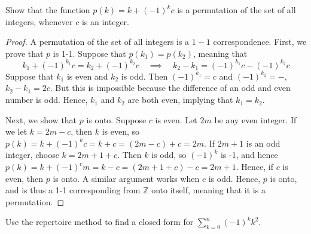 \documentclass[12pt]{article}
\newenvironment{ex}[2][Exercise]{\begin{trivlist}
		\item[\hskip \labelsep {\bfseries #1}\hskip \labelsep {\bfseries #2.}]}{\end{trivlist}}
\newenvironment{sol}[1][Solution]{\begin{trivlist}
		\item[\hskip \labelsep {\bfseries #1:}]}{\end{trivlist}}
\begin{document}
\begin{ex}{12}
	Show that the function $p(k)=k+(-1)^kc$ is a permutation of the
	set of all integers, whenever $c$ is an integer.
\end{ex}

\begin{sol}
	\begin{proof}
		A permutation of the set of all integers is a $1-1$ correspondence. First, we prove that
		$p$ is 1-1. Suppose that $p(k_1)=p(k_2)$, meaning that
		\[
		k_1+(-1)^{k_1}c=k_2+(-1)^{k_2}c\quad\implies\quad k_2-k_1=(-1)^{k_1}c-(-1)^{k_2}c
		\]
		Suppose that $k_1$ is even and $k_2$ is odd. Then $(-1)^{k_1}=c$ and $(-1)^{k_2}=-$,
		$k_2-k_1=2c$. But this is impossible because the difference of an odd and
		even number is odd. Hence, $k_1$ and $k_2$ are both even, implying that $k_1=k_2$.
		\
		
		Next, we show that $p$ is onto. Suppose $c$ is even. Let $2m$ be any even integer.
		If we let $k=2m-c$, then $k$ is even, so $p(k)=k+(-1)^{k}c=k+c=(2m-c)+c=2m$.
		If $2m+1$ is an odd integer, choose $k=2m+1+c$. Then $k$ is odd, so $(-1)^k$ is -1,
		and hence $p(k)=k+(-1)^cm=k-c=(2m+1+c)-c=2m+1$. Hence, if $c$ is even, then $p$ is
		onto. A similar argument works when $c$ is odd. Hence, $p$ is onto, and is thus a 1-1
		corresponding from $\mathbb{Z}$ onto itself, meaning that it is a permutation.
	\end{proof}
\end{sol}

\begin{ex}{13}
	Use the repertoire method to find a closed form for $\sum_{k=0}^{n}(-1)^kk^2$.
\end{ex}
\end{document}
